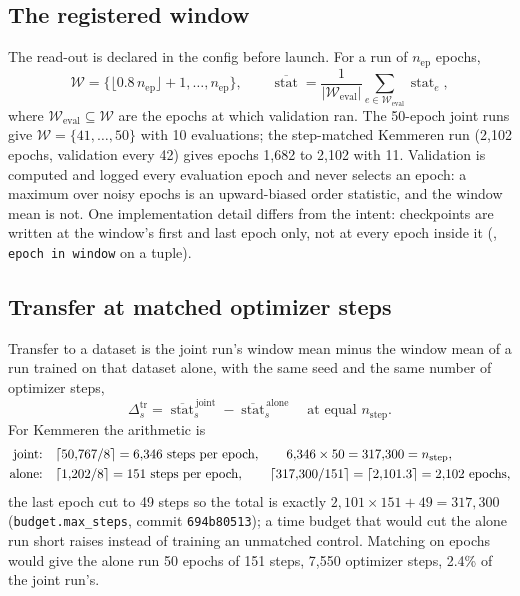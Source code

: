 \subsection{The registered window}
\label{sec:window}

The read-out is declared in the config before launch. For a run of $n_{\mathrm{ep}}$ epochs,
\begin{equation}
\mathcal{W} = \big\{\lfloor 0.8\, n_{\mathrm{ep}} \rfloor + 1, \ldots, n_{\mathrm{ep}}\big\},
\qquad
\overline{\operatorname{stat}} = \frac{1}{|\mathcal{W}_{\mathrm{eval}}|} \sum_{e \in \mathcal{W}_{\mathrm{eval}}} \operatorname{stat}_e,
\label{eq:window}
\end{equation}
where $\mathcal{W}_{\mathrm{eval}} \subseteq \mathcal{W}$ are the epochs at which validation
ran. The 50-epoch joint runs give $\mathcal{W} = \{41, \ldots, 50\}$ with 10 evaluations;
the step-matched Kemmeren run (2{,}102 epochs, validation every 42) gives epochs 1{,}682 to
2{,}102 with 11. Validation is computed and logged every evaluation epoch and never selects
an epoch: a maximum over noisy epochs is an upward-biased order statistic, and the window
mean is not. One implementation detail differs from the intent: checkpoints are written at
the window's first and last epoch only, not at every epoch inside it
(, \texttt{epoch in window} on a tuple).

\subsection{Transfer at matched optimizer steps}
\label{sec:transfer}

Transfer to a dataset is the joint run's window mean minus the window mean of a run trained
on that dataset alone, with the same seed and the same number of optimizer steps,
\begin{equation}
\Delta^{\mathrm{tr}}_s = \overline{\operatorname{stat}}^{\,\mathrm{joint}}_s - \overline{\operatorname{stat}}^{\,\mathrm{alone}}_s
\quad \text{at equal } n_{\mathrm{step}}.
\label{eq:transfer}
\end{equation}
For Kemmeren the arithmetic is
\begin{align}
\text{joint:}\quad & \lceil 50{,}767 / 8 \rceil = 6{,}346 \text{ steps per epoch},
\qquad 6{,}346 \times 50 = 317{,}300 = n_{\mathrm{step}},
\label{eq:stepsjoint}\\
\text{alone:}\quad & \lceil 1{,}202 / 8 \rceil = 151 \text{ steps per epoch},
\qquad \lceil 317{,}300 / 151 \rceil = \lceil 2{,}101.3 \rceil = 2{,}102 \text{ epochs},
\label{eq:stepsalone}
\end{align}
the last epoch cut to 49 steps so the total is exactly $2{,}101 \times 151 + 49 = 317{,}300$
(\texttt{budget.max\_steps}, commit \texttt{694b80513}); a time budget that would cut the
alone run short raises instead of training an unmatched control. Matching on epochs would
give the alone run 50 epochs of 151 steps, 7{,}550 optimizer steps, 2.4\% of the joint run's.

